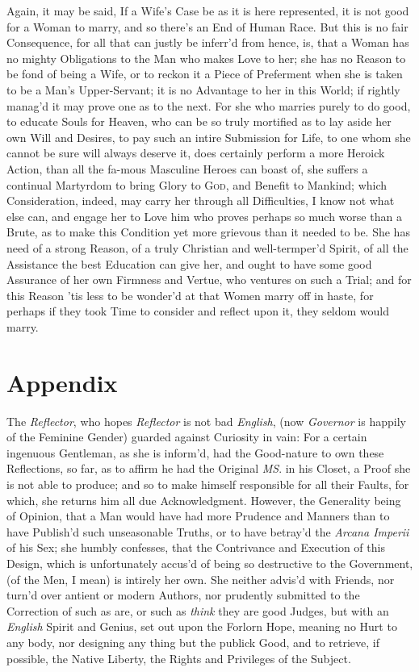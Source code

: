 Again, it may be said, If a Wife's Case be as it is here represented,
it is not good for a Woman to marry, and so there's an End of Human
Race. But this is no fair Consequence, for all that can justly be
inferr'd from hence, is, that a Woman has no mighty Obligations to the
Man who makes Love to her; she has no Reason to be fond of being a
Wife, or to reckon it a Piece of Preferment when she is taken to be a
Man's Upper-Servant; it is no Advantage to her in this World; if
rightly manag'd it may prove one as to the next. For she who marries
purely to do good, to educate Souls for Heaven, who can be so truly
mortified as to lay aside her own Will and Desires, to pay such an
intire Submission for Life, to one whom she cannot be sure will always
deserve it, does certainly perform a more Heroick Action, than all the
fa-mous Masculine Heroes can boast of, she suffers a
continual Martyrdom to bring Glory to \textsc{God}, and Benefit to
Mankind; which Consideration, indeed, may carry her through all
Difficulties, I know not what else can, and engage her to Love him who
proves perhaps so much worse than a Brute, as to make this Condition
yet more grievous than it needed to be. She has need of a strong
Reason, of a truly Christian and well-termper'd Spirit, of all the
Assistance the best Education can give her, and ought to have some
good Assurance of her own Firmness and Vertue, who ventures on such a
Trial; and for this Reason 'tis less to be wonder'd at that Women
marry off in haste, for perhaps if they took Time to consider and
reflect upon it, they seldom would marry.

\section*{Appendix}

The \textit{Reflector}, who hopes \textit{Reflector} is not bad
\textit{English}, (now \textit{Governor} is happily of the Feminine
Gender) guarded against Curiosity in vain: For a certain ingenuous
Gentleman, as she is inform'd, had the Good-nature to own these
Reflections, so far, as to affirm he had the Original \textit{MS}. in
his Closet, a Proof she is not able to produce; and so to make himself
responsible for all their Faults, for which, she returns him all due
Acknowledgment. However, the Generality being of Opinion, that a Man
would have had more Prudence and Manners than to have Publish'd such
 unseasonable Truths, or to have betray'd the \textit{Arcana
Imperii} of his Sex; she humbly confesses, that the Contrivance and
Execution of this Design, which is unfortunately accus'd of being so
destructive to the Government, (of the Men, I mean) is intirely her
own. She neither advis'd with Friends, nor turn'd over antient or
modern Authors, nor prudently submitted to the Correction of such as
are, or such as \textit{think} they are good Judges, but with an
\textit{English} Spirit and Genius, set out upon the Forlorn Hope,
meaning no Hurt to any body, nor designing any thing but the publick
Good, and to retrieve, if possible, the Native Liberty, the Rights and
Privileges of the Subject.


